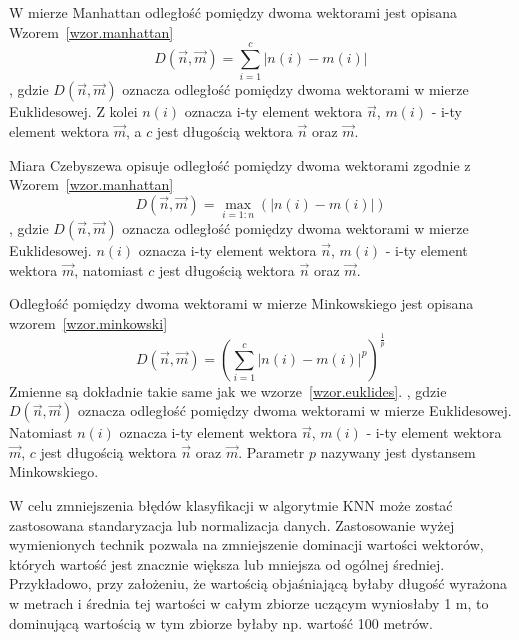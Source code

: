 \documentclass[a4paper,twoside,12pt]{book}
\begin{document}
    W mierze Manhattan odległość pomiędzy dwoma wektorami jest opisana Wzorem~\ref{wzor.manhattan}
    \large
    \begin{equation}
        D(\overrightarrow{n},\overrightarrow{m})=\sum_{i=1}^{c}\left |n(i)-m(i)\right |
        \label{wzor.manhattan}
    \end{equation}
    \normalsize
    , gdzie $D(\overrightarrow{n},\overrightarrow{m})$ oznacza odległość pomiędzy dwoma wektorami w mierze Euklidesowej.
    Z kolei $n(i)$ oznacza i-ty element wektora $\overrightarrow{n}$,  $m(i)$ - i-ty element wektora
    $\overrightarrow{m}$, a $c$ jest długością wektora  $\overrightarrow{n}$ oraz $\overrightarrow{m}$.

    Miara Czebyszewa opisuje odległość pomiędzy dwoma wektorami zgodnie z Wzorem~\ref{wzor.manhattan}
    \large
    \begin{equation}
        D(\overrightarrow{n},\overrightarrow{m})=\max_{i=1:n}( \left |n(i)-m(i) \right |)
        \label{wzor.czebyszew}
    \end{equation}
    \normalsize
    , gdzie $D(\overrightarrow{n},\overrightarrow{m})$ oznacza odległość pomiędzy dwoma wektorami w mierze Euklidesowej.
    $n(i)$ oznacza i-ty element wektora $\overrightarrow{n}$,  $m(i)$ - i-ty element wektora
    $\overrightarrow{m}$, natomiast $c$ jest długością wektora  $\overrightarrow{n}$ oraz $\overrightarrow{m}$.

    Odległość pomiędzy dwoma wektorami w mierze Minkowskiego jest opisana wzorem~\ref{wzor.minkowski}
    \large
    \begin{equation}
        D(\overrightarrow{n},\overrightarrow{m})=(\sum_{i=1}^{c} \left |n(i)-m(i) \right |^{p})^{\frac{1}{p}}
        \label{wzor.minkowski}
    \end{equation}
    \normalsize
    Zmienne są dokładnie takie same jak we wzorze~\ref{wzor.euklides}.
    , gdzie $D(\overrightarrow{n},\overrightarrow{m})$ oznacza odległość pomiędzy dwoma wektorami w mierze Euklidesowej.
    Natomiast $n(i)$ oznacza i-ty element wektora $\overrightarrow{n}$,  $m(i)$ - i-ty element wektora
    $\overrightarrow{m}$, $c$ jest długością wektora $\overrightarrow{n}$ oraz $\overrightarrow{m}$.
    Parametr $p$ nazywany jest dystansem Minkowskiego.

    W celu zmniejszenia błędów klasyfikacji w algorytmie KNN może zostać zastosowana standaryzacja lub normalizacja danych.
    Zastosowanie wyżej wymienionych technik pozwala na zmniejszenie dominacji wartości wektorów, których wartość jest
    znacznie większa lub mniejsza od ogólnej średniej. Przykładowo, przy założeniu, że
    wartością objaśniającą byłaby długość wyrażona w metrach i średnia tej wartości w całym zbiorze uczącym
    wyniosłaby 1 m,
    to dominującą wartością w tym zbiorze byłaby np. wartość 100 metrów.
\end{document}
